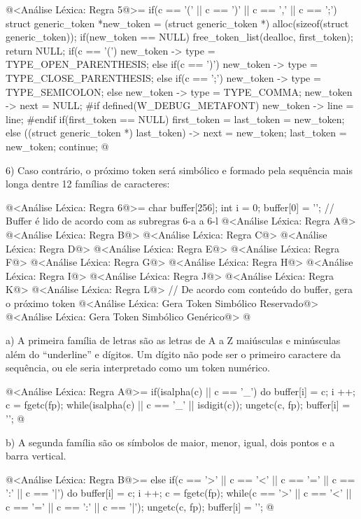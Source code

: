 \iniciocodigo
@<Análise Léxica: Regra 5@>=
if(c == '(' || c == ')' || c == ',' || c == ';'){
  struct generic_token *new_token =
     (struct generic_token *) alloc(sizeof(struct generic_token));
  if(new_token == NULL){
    free_token_list(dealloc, first_token);
    return NULL;
  }
  if(c == '(')
    new_token -> type = TYPE_OPEN_PARENTHESIS;
  else if(c == ')')
    new_token -> type = TYPE_CLOSE_PARENTHESIS;
  else if(c == ';')
    new_token -> type = TYPE_SEMICOLON;
  else
    new_token -> type = TYPE_COMMA;
  new_token -> next = NULL;
#if defined(W_DEBUG_METAFONT)
  new_token -> line = line;
#endif
  if(first_token == NULL)
    first_token = last_token = new_token;
  else{
    ((struct generic_token *) last_token) -> next = new_token;
    last_token = new_token;
  }
  continue;
}
@
\fimcodigo

6) Caso contrário, o próximo token será simbólico e formado pela
sequência mais longa dentre 12 famílias de caracteres:

\iniciocodigo
@<Análise Léxica: Regra 6@>=
{
  char buffer[256];
  int i = 0;
  buffer[0] = '\0';
  // Buffer é lido de acordo com as subregras 6-a a 6-l
  @<Análise Léxica: Regra A@>
  @<Análise Léxica: Regra B@>
  @<Análise Léxica: Regra C@>
  @<Análise Léxica: Regra D@>
  @<Análise Léxica: Regra E@>
  @<Análise Léxica: Regra F@>
  @<Análise Léxica: Regra G@>
  @<Análise Léxica: Regra H@>
  @<Análise Léxica: Regra I@>
  @<Análise Léxica: Regra J@>
  @<Análise Léxica: Regra K@>
  @<Análise Léxica: Regra L@>
  // De acordo com conteúdo do buffer, gera o próximo token
  @<Análise Léxica: Gera Token Simbólico Reservado@>
  @<Análise Léxica: Gera Token Simbólico Genérico@>
}
@
\fimcodigo


a) A primeira família de letras são as letras de A a Z maiúsculas e
minúsculas além do ``underline'' e dígitos. Um dígito não pode ser o
primeiro caractere da sequência, ou ele seria interpretado como um
token numérico.


\iniciocodigo
@<Análise Léxica: Regra A@>=
if(isalpha(c) || c == '_'){
  do{
    buffer[i] = c;
    i ++;
    c = fgetc(fp);
  } while(isalpha(c) || c == '_' || isdigit(c));
  ungetc(c, fp);
  buffer[i] = '\0';
}
@
\fimcodigo

b) A segunda família são os símbolos de maior, menor, igual, dois
pontos e a barra vertical.

\iniciocodigo
@<Análise Léxica: Regra B@>=
else if(c == '>' || c == '<' || c == '=' || c == ':' || c == '|'){
  do{
    buffer[i] = c;
    i ++;
    c = fgetc(fp);
  } while(c == '>' || c == '<' || c == '=' || c == ':' || c == '|');
  ungetc(c, fp);
  buffer[i] = '\0';
}
@
\fimcodigo

